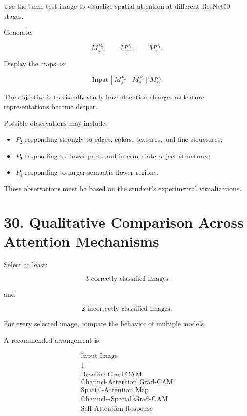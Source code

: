 \documentclass[10pt]{article}
\begin{document}
Use the same test image to visualize spatial attention at different ResNet50
stages.

Generate:

\[
M_s^{P_2},
\qquad
M_s^{P_3},
\qquad
M_s^{P_4}.
\]

Display the maps as:

\[
\boxed{
\text{Input}
\;|\;
M_s^{P_2}
\;|\;
M_s^{P_3}
\;|\;
M_s^{P_4}
}
\]

The objective is to visually study how attention changes as feature
representations become deeper.

Possible observations may include:

\begin{itemize}

\item $P_2$ responding strongly to edges, colors, textures, and fine
structures;

\item $P_3$ responding to flower parts and intermediate object structures;

\item $P_4$ responding to larger semantic flower regions.

\end{itemize}

These observations must be based on the student's experimental
visualizations.

\section*{30. Qualitative Comparison Across Attention Mechanisms}

Select at least:

\[
\boxed{
3\text{ correctly classified images}
}
\]

and

\[
\boxed{
2\text{ incorrectly classified images}.
}
\]

For every selected image, compare the behavior of multiple models.

A recommended arrangement is:

\[
\boxed{
\begin{array}{c}
\text{Input Image}\\
\downarrow\\
\text{Baseline Grad-CAM}\\
\text{Channel-Attention Grad-CAM}\\
\text{Spatial-Attention Map}\\
\text{Channel+Spatial Grad-CAM}\\
\text{Self-Attention Response}
\end{array}
}
\]
\end{document}

